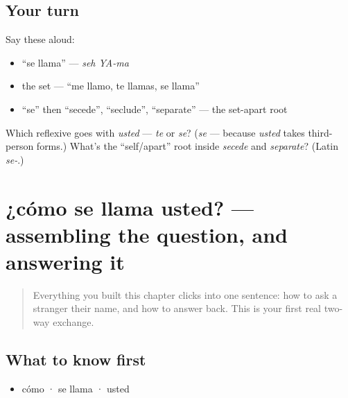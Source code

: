 \subsection*{Your turn}
Say these aloud:

\begin{itemize}
\raggedright
  \item \textquotedblleft{}se llama\textquotedblright{} — \emph{seh YA-ma}
  \item the set — \textquotedblleft{}me llamo, te llamas, se llama\textquotedblright{}
  \item \textquotedblleft{}se\textquotedblright{} then \textquotedblleft{}secede\textquotedblright{}, \textquotedblleft{}seclude\textquotedblright{}, \textquotedblleft{}separate\textquotedblright{} — the set-apart root
\end{itemize}

\begin{tcolorbox}[breakable,colback=teal!4,colframe=teal!35!black,title={Before you move on}]
Which reflexive goes with \emph{usted} — \emph{te} or \emph{se}? (\emph{se} — because \emph{usted} takes third-person forms.) What's the \textquotedblleft{}self/apart\textquotedblright{} root inside \emph{secede} and \emph{separate}? (Latin \emph{se-}.)
\end{tcolorbox}
\section[¿cómo se llama usted?]{¿cómo se llama usted? — assembling the question, and answering it}

\label{lesson:ES-C03-como-se-llama}



\begin{quote}
Everything you built this chapter clicks into one sentence: how to ask a stranger their name, and how to answer back. This is your first real two-way exchange.
\end{quote}

\subsection*{What to know first}
\begin{itemize}
\raggedright
  \item cómo · se llama · usted
\end{itemize}


